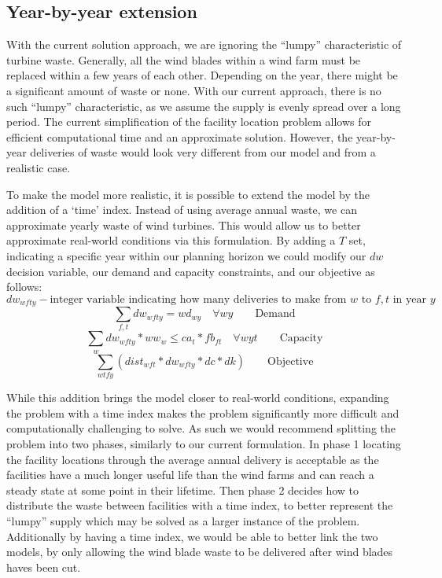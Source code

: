 \subsection{Year-by-year extension}
With the current solution approach, we are ignoring the “lumpy” characteristic of turbine waste. Generally, all the wind blades within a wind farm must be replaced within a few years of each other. Depending on the year, there might be a significant amount of waste or none. With our current approach, there is no such “lumpy” characteristic, as we assume the supply is evenly spread over a long period. The current simplification of the facility location problem allows for efficient computational time and an approximate solution. However, the year-by-year deliveries of waste would look very different from our model and from a realistic case. 

To make the model more realistic, it is possible to extend the model by the addition of a ‘time’ index. Instead of using average annual waste, we can approximate yearly waste of wind turbines. This would allow us to better approximate real-world conditions via this formulation. By adding a $T$ set, indicating a specific year within our planning horizon we could modify our $dw$ decision variable, our demand and capacity constraints, and our objective as follows: 
\begin{equation}
    dw_{wfty} - \text{integer variable indicating how many deliveries to make from } w \text{ to } f,t \text{ in year } y
\end{equation}
\vspace{-10pt}
\begin{equation}
    \sum_{f,t} dw_{wfty} = wd_{wy} \quad \forall wy \quad \quad \text{Demand}
\end{equation}
\vspace{-10pt}
\begin{equation}
    \sum_{w} dw_{wfty} * ww_{w} \le ca_{t} * fb_{ft} \quad \forall wyt \quad \quad \text{Capacity}
\end{equation}
\vspace{-10pt}
\begin{equation}
    \sum_{wtfy} (dist_{wft} * dw_{wfty} * dc * dk) \quad \quad \text{Objective}
\end{equation}

While this addition brings the model closer to real-world conditions, expanding the problem with a time index makes the problem significantly more difficult and computationally challenging to solve. As such we would recommend splitting the problem into two phases, similarly to our current formulation. In phase 1 locating the facility locations through the average annual delivery is acceptable as the facilities have a much longer useful life than the wind farms and can reach a steady state at some point in their lifetime. Then phase 2 decides how to distribute the waste between facilities with a time index, to better represent the “lumpy” supply which may be solved as a larger instance of the problem. Additionally by having a time index, we would be able to better link the two models, by only allowing the wind blade waste to be delivered after wind blades haves been cut.